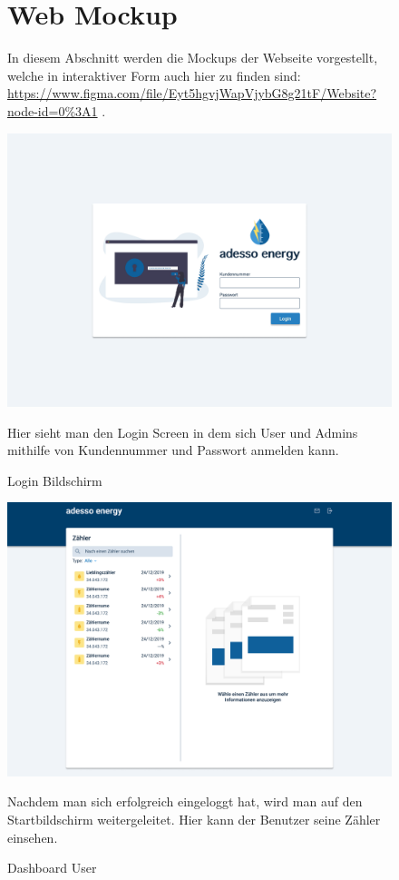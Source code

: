 
\newpage

\begin{figure}[h] 
	\newpage
	\section{Web Mockup}

	In diesem Abschnitt werden die Mockups der Webseite vorgestellt, welche in interaktiver Form auch hier zu finden sind:
	\url{https://www.figma.com/file/Eyt5hgvjWapVjybG8g21tF/Website?node-id=0%3A1} .

	\centering
    \includegraphics[scale=0.3]{img/WebsiteMockup/Login-User}
	\caption{Login Bildschirm} \hfill \break
	Hier sieht man den Login Screen in dem sich User und Admins mithilfe von Kundennummer und Passwort anmelden kann.
\end{figure}
 
\newpage

\begin{figure}[h]
	\centering
    \includegraphics[scale=0.3]{img/WebsiteMockup/Dashboard-User-NonSelected}
	\caption{Dashboard User} \hfill \break
	Nachdem man sich erfolgreich eingeloggt hat, wird man auf den Startbildschirm weitergeleitet. Hier kann der Benutzer seine Zähler einsehen.
\end{figure}

